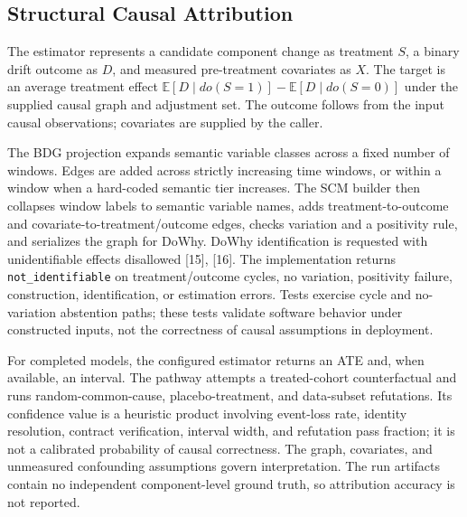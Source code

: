 \documentclass[conference]{IEEEtran}
\begin{document}
\subsection{Structural Causal Attribution}
The estimator represents a candidate component change as treatment $S$, a binary drift outcome as $D$, and measured pre-treatment covariates as $X$. The target is an average treatment effect $\mathbb{E}[D\mid do(S=1)]-\mathbb{E}[D\mid do(S=0)]$ under the supplied causal graph and adjustment set. The outcome follows from the input causal observations; covariates are supplied by the caller.

The BDG projection expands semantic variable classes across a fixed number of windows. Edges are added across strictly increasing time windows, or within a window when a hard-coded semantic tier increases. The SCM builder then collapses window labels to semantic variable names, adds treatment-to-outcome and covariate-to-treatment/outcome edges, checks variation and a positivity rule, and serializes the graph for DoWhy. DoWhy identification is requested with unidentifiable effects disallowed [15], [16]. The implementation returns \texttt{not\_identifiable} on treatment/outcome cycles, no variation, positivity failure, construction, identification, or estimation errors. Tests exercise cycle and no-variation abstention paths; these tests validate software behavior under constructed inputs, not the correctness of causal assumptions in deployment.

For completed models, the configured estimator returns an ATE and, when available, an interval. The pathway attempts a treated-cohort counterfactual and runs random-common-cause, placebo-treatment, and data-subset refutations. Its confidence value is a heuristic product involving event-loss rate, identity resolution, contract verification, interval width, and refutation pass fraction; it is not a calibrated probability of causal correctness. The graph, covariates, and unmeasured confounding assumptions govern interpretation. The run artifacts contain no independent component-level ground truth, so attribution accuracy is not reported.
\end{document}
